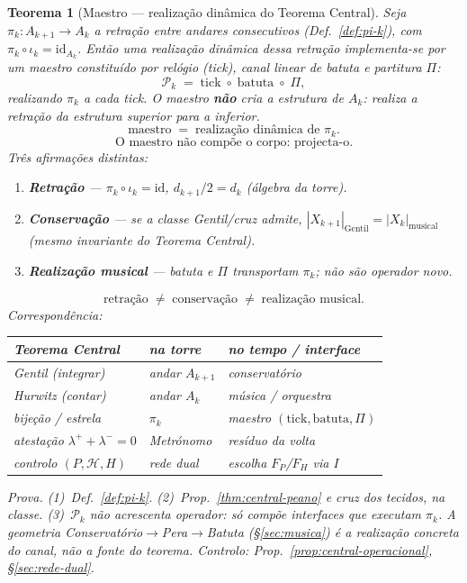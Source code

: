\documentclass[11pt,a4paper]{article}
\newtheorem{teorema}{Teorema}
\begin{document}
\begin{teorema}[Maestro --- realização dinâmica do Teorema Central]\label{thm:proj-maestro}
Seja $\pi_k\colon A_{k+1}\to A_k$ a retração entre andares consecutivos
(Def.~\ref{def:pi-k}), com $\pi_k\circ\iota_k=\mathrm{id}_{A_k}$.
Então uma realização dinâmica dessa retração implementa-se por um
maestro constituído por relógio (tick), canal linear de batuta e
partitura $\Pi$:
\[
\boxed{
\mathcal{P}_k
\;=\;
\mathrm{tick}
\;\circ\;
\mathrm{batuta}
\;\circ\;
\Pi,
}
\]
realizando $\pi_k$ a cada tick. O maestro \textbf{não} cria a
estrutura de $A_k$: realiza a retração da estrutura superior para a
inferior.
\[
\boxed{
\mathrm{maestro}
\;=\;
\text{realização dinâmica de }\pi_k.
}
\]
\[
\boxed{
\text{O maestro não compõe o corpo: projecta-o.}
}
\]
Três afirmações distintas:
\begin{enumerate}
\item \textbf{Retração} --- $\pi_k\circ\iota_k=\mathrm{id}$,
$d_{k+1}/2=d_k$ (álgebra da torre).
\item \textbf{Conservação} --- se a classe Gentil/cruz admite,
$|X_{k+1}|_{\mathrm{Gentil}}=|X_k|_{\mathrm{musical}}$ (mesmo
invariante do Teorema Central).
\item \textbf{Realização musical} --- batuta e $\Pi$ transportam
$\pi_k$; não são operador novo.
\end{enumerate}
\[
\boxed{
\text{retração}
\;\neq\;
\text{conservação}
\;\neq\;
\text{realização musical}.
}
\]
Correspondência:
\begin{center}\small
\begin{tabular}{@{}lll@{}}
Teorema Central & na torre & no tempo / interface \\
\hline
Gentil (integrar) & andar $A_{k+1}$ & conservatório \\
Hurwitz (contar) & andar $A_k$ & música / orquestra \\
bijeção / estrela & $\pi_k$ & maestro $(\mathrm{tick},\mathrm{batuta},\Pi)$ \\
atestação $\lambda^{+}+\lambda^{-}=0$ & Metrónomo & resíduo da volta \\
controlo $(P,\mathcal{H},H)$ & rede dual & escolha $F_P$/$F_H$ via $I$ \\
\end{tabular}
\end{center}
\emph{Prova.} (1)~Def.~\ref{def:pi-k}. (2)~Prop.~\ref{thm:central-peano}
e cruz dos tecidos, na classe. (3)~$\mathcal{P}_k$ não acrescenta
operador: só compõe interfaces que executam $\pi_k$. A geometria
Conservatório$\to$Pera$\to$Batuta (\S\ref{sec:musica}) é a realização
concreta do canal, não a fonte do teorema. Controlo:
Prop.~\ref{prop:central-operacional}, \S\ref{sec:rede-dual}.
\end{teorema}
\end{document}
